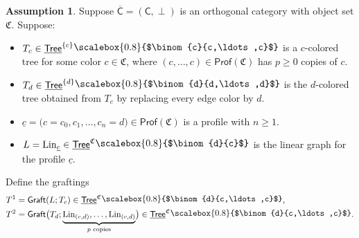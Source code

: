 \documentclass[11pt]{amsbook}
\numberwithin{section}{chapter}
\numberwithin{subsection}{section}
\numberwithin{equation}{section}
\theoremstyle{plain}
\theoremstyle{definition}
\newtheorem{assumption}[equation]{Assumption}
\newcommand{\colorc}{\mathfrak{C}}
\newcommand{\graft}{\mathsf{Graft}}
\newcommand{\Lin}{\mathrm{Lin}}
\newcommand{\Prof}{\mathsf{Prof}}
\newcommand{\Profc}{\Prof(\colorc)}
\newcommand{\C}{\mathsf{C}}
\newcommand{\Cbar}{\overline{\C}}
\newcommand{\Tree}{\mathsf{Tree}}
\newcommand{\uTree}{\underline{\Tree}}
\newcommand{\uTreec}{\uTree^{\colorc}}
\newcommand{\uc}{\underline c}
\newcommand{\smallprof}[1]
{\raisebox{.05cm}{\scalebox{0.8}{#1}}}
\newcommand{\ccc}{\smallprof{$\binom{c}{c,\ldots,c}$}}
\newcommand{\dc}{\smallprof{$\binom{d}{c}$}}
\newcommand{\dcc}{\smallprof{$\binom{d}{c,\ldots,c}$}}
\newcommand{\ddd}{\smallprof{$\binom{d}{d,\ldots,d}$}}
\begin{document}
\begin{assumption}\label{assumption:hcdiag-ainfinity}
Suppose $\Cbar = (\C,\perp)$ is an orthogonal category with object set $\colorc$.  Suppose:
\begin{itemize}\item $T_c \in \uTree^{\{c\}}\ccc$ is a $c$-colored tree for some color $c \in \colorc$, where $(c,\ldots,c) \in \Profc$ has $p \geq 0$ copies of $c$.  
\item $T_d \in \uTree^{\{d\}}\ddd$ is the $d$-colored tree obtained from $T_c$ by replacing every edge color by $d$.  
\item $\uc=\bigl(c=c_0,c_1,\ldots,c_n=d\bigr) \in \Profc$ is a profile with $n \geq 1$.
\item $L = \Lin_{\uc} \in \uTreec\dc$ is the linear graph for the profile $\uc$.  
\end{itemize}
Define the graftings \[\begin{split}T^1 &= \graft(L;T_c) \in \uTreec\dcc,\\
T^2 &= \graft\bigl(T_d;\underbrace{\Lin_{(c,d)},\ldots,\Lin_{(c,d)}}_{\text{$p$ copies}}\bigr) \in \uTreec\dcc.\end{split}\]


\end{assumption}
\end{document}
